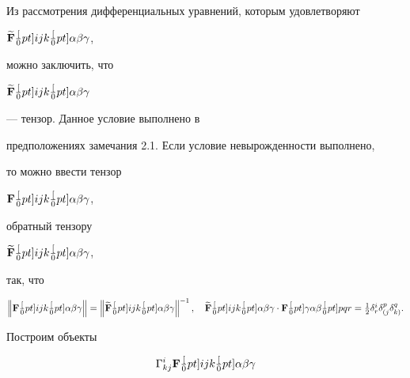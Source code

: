 \begin{notes} 


Из рассмотрения дифференциальных уравнений, которым удовлетворяют 


$\widetilde{\bold F}


\textstyle\frac[0pt]{i}{jk}\textstyle\frac[0pt]{\alpha\beta}{\gamma}$, 


можно заключить, что 


$\widetilde{\bold F}


\textstyle\frac[0pt]{i}{jk}\textstyle\frac[0pt]{\alpha\beta}{\gamma}$ 


--- тензор. Данное условие выполнено в  


предположениях замечания 2.1. Если условие невырожденности выполнено,  


то можно ввести тензор 


$\bold F


\textstyle\frac[0pt]{i}{jk}\textstyle\frac[0pt]{\alpha\beta}{\gamma}$, 


обратный тензору 


$\widetilde{\bold F}


\textstyle\frac[0pt]{i}{jk}\textstyle\frac[0pt]{\alpha\beta}{\gamma}$,


так, что 


$$ 


\left\|\bold F


\textstyle\frac[0pt]{i}{jk}\textstyle\frac[0pt]{\alpha\beta}{\gamma}\right\|= 


\left\|\widetilde{\bold F}


\textstyle\frac[0pt]{i}{jk}\textstyle\frac[0pt]{\alpha\beta}{\gamma}


\right\|^{-1},\quad


\widetilde{\bold F}


\textstyle\frac[0pt]{i}{jk}\textstyle\frac[0pt]{\alpha\beta}{\gamma}\cdot 


\bold F


\textstyle\frac[0pt]{\gamma}{\alpha\beta}\textstyle\frac[0pt]{pq}{r}


=\frac{1}{2}\delta^i_r\delta^p_{(j}\delta^q_{k)}.


$$ 


Построим объекты 


\begin{gather} 


\Gamma^i_{kj}\bold F


\textstyle\frac[0pt]{i}{jk}\textstyle\frac[0pt]{\alpha\beta}{\gamma}



\end{gather}
\end{notes}
